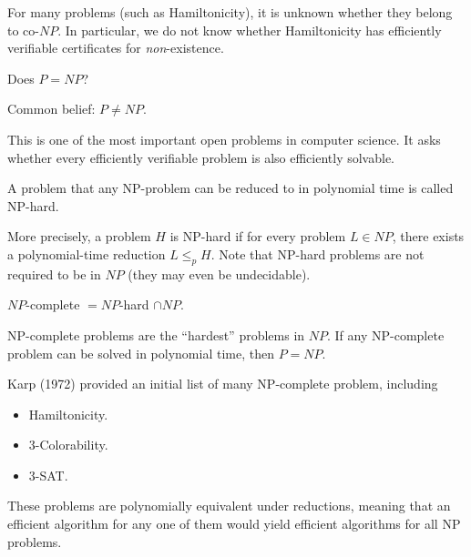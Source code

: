 \begin{remark}
For many problems (such as Hamiltonicity), it is unknown whether they belong to co-$NP$. 
In particular, we do not know whether Hamiltonicity has efficiently verifiable certificates for \emph{non}-existence.
\end{remark}

\begin{question}
    Does $P = NP$? 
\end{question}

Common belief: $P \neq NP$.

\begin{remark}
This is one of the most important open problems in computer science. It asks whether every efficiently verifiable problem is also efficiently solvable.
\end{remark}

\begin{definition}[NP-hard]
    A problem that any NP-problem can be reduced to in polynomial time is called NP-hard.
\end{definition}

\begin{remark}
More precisely, a problem $H$ is NP-hard if for every problem $L \in NP$, there exists a polynomial-time reduction $L \le_p H$.
Note that NP-hard problems are not required to be in $NP$ (they may even be undecidable).
\end{remark}

\begin{definition}[NP-complete]
    $NP$-complete $= NP$-hard $\cap NP$.   
\end{definition}

\begin{remark}
NP-complete problems are the ``hardest'' problems in $NP$. If any NP-complete problem can be solved in polynomial time, then $P = NP$.
\end{remark}

Karp (1972) provided an initial list of many NP-complete problem, including
\begin{itemize}
    \item Hamiltonicity. 
    \item 3-Colorability. 
    \item 3-SAT.
\end{itemize}

\begin{remark}
These problems are polynomially equivalent under reductions, meaning that an efficient algorithm for any one of them would yield efficient algorithms for all NP problems.
\end{remark}

